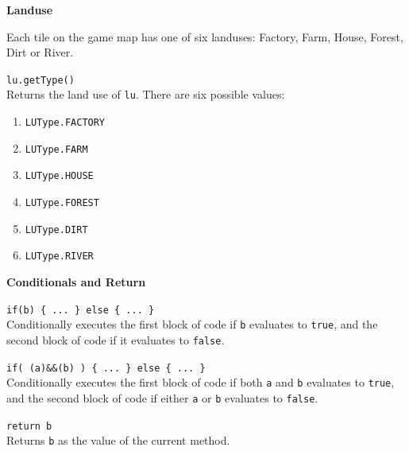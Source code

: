 \documentclass[10pt,twocolumn]{article}
\begin{document}
\noindent\textbf{\large Landuse}
\begin{description}

\item{}
Each tile on the game map has one of six landuses: Factory, Farm, House, Forest, Dirt or River.

\item{\texttt{lu.getType()}}\ \\[.25em]
%
  Returns the land use of \texttt{lu}. There are six possible values:
  \begin{enumerate}
  \item\texttt{LUType.FACTORY}
  \item\texttt{LUType.FARM}
  \item\texttt{LUType.HOUSE}
  \item\texttt{LUType.FOREST}
  \item\texttt{LUType.DIRT}
  \item\texttt{LUType.RIVER}
  \end{enumerate}

\end{description}


\medskip

\noindent\textbf{\large Conditionals and Return}
\begin{description}

\item{\texttt{if(b) \{ ... \} else \{ ... \}}}\ \\[.25em] 
% 
Conditionally executes the first block of code if \texttt{b} evaluates to
\texttt{true}, and the second block of code if it evaluates to \texttt{false}.

\item{\texttt{if( (a)\&\&(b) ) \{ ... \} else \{ ... \}}}\ \\[.25em] 
% 
Conditionally executes the first block of code if both \texttt{a} and \texttt{b} evaluates to
\texttt{true}, and the second block of code if either \texttt{a} or \texttt{b} evaluates to \texttt{false}.

\item{\texttt{return b}} \ \\[.25em]
%
  Returns \texttt{b} as the value of the current method.
\end{description}
\medskip

\medskip
\end{document}

